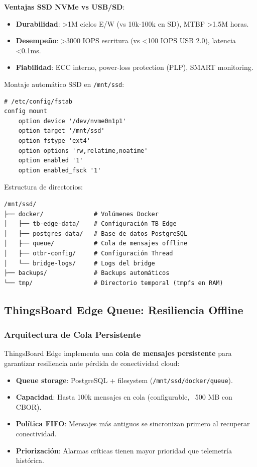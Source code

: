 \textbf{Ventajas SSD NVMe vs USB/SD}:
\begin{itemize}
    \item \textbf{Durabilidad}: >1M ciclos E/W (vs 10k-100k en SD), MTBF >1.5M horas.
    \item \textbf{Desempeño}: >3000 IOPS escritura (vs <100 IOPS USB 2.0), latencia <0.1ms.
    \item \textbf{Fiabilidad}: ECC interno, power-loss protection (PLP), SMART monitoring.
\end{itemize}

Montaje automático SSD en \texttt{/mnt/ssd}:
\begin{verbatim}
# /etc/config/fstab
config mount
    option device '/dev/nvme0n1p1'
    option target '/mnt/ssd'
    option fstype 'ext4'
    option options 'rw,relatime,noatime'
    option enabled '1'
    option enabled_fsck '1'
\end{verbatim}

Estructura de directorios:
\begin{verbatim}
/mnt/ssd/
├── docker/              # Volúmenes Docker
│   ├── tb-edge-data/    # Configuración TB Edge
│   ├── postgres-data/   # Base de datos PostgreSQL
│   ├── queue/           # Cola de mensajes offline
│   ├── otbr-config/     # Configuración Thread
│   └── bridge-logs/     # Logs del bridge
├── backups/             # Backups automáticos
└── tmp/                 # Directorio temporal (tmpfs en RAM)
\end{verbatim}

\subsection{ThingsBoard Edge Queue: Resiliencia Offline}

\subsubsection{Arquitectura de Cola Persistente}

ThingsBoard Edge implementa una \textbf{cola de mensajes persistente} para garantizar resiliencia ante pérdida de conectividad cloud:

\begin{itemize}
    \item \textbf{Queue storage}: PostgreSQL + filesystem (\texttt{/mnt/ssd/docker/queue}).
    \item \textbf{Capacidad}: Hasta 100k mensajes en cola (configurable, ~500 MB con CBOR).
    \item \textbf{Política FIFO}: Mensajes más antiguos se sincronizan primero al recuperar conectividad.
    \item \textbf{Priorización}: Alarmas críticas tienen mayor prioridad que telemetría histórica.
\end{itemize}

